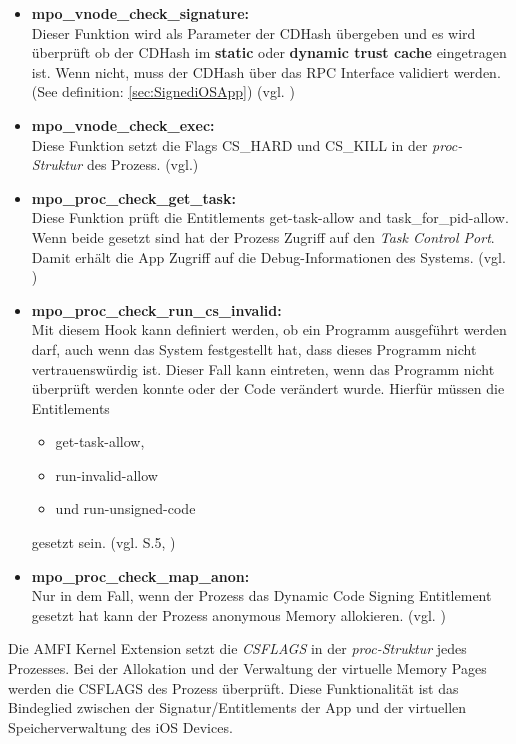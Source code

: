 \begin{itemize}
    \item \label{item:AMFIfunc} \textbf{mpo\_vnode\_check\_signature:} \\
    Dieser Funktion wird als Parameter der CDHash übergeben und es wird überprüft ob der CDHash im \textbf{static} oder \textbf{dynamic trust cache} eingetragen ist. Wenn nicht, muss der CDHash über das RPC Interface validiert werden. (See definition: \ref{sec:SignediOSApp}) (vgl. \cite{iOSSec[5], Hacking[1]})
    \item \textbf{mpo\_vnode\_check\_exec:}\\
    Diese Funktion setzt die Flags CS\_HARD und CS\_KILL in der \textit{\glqq proc-Struktur\grqq{}} des Prozess. (vgl.\cite{iOSSec[5],  Hacking[1]})
    \item \textbf{mpo\_proc\_check\_get\_task:}\\
    Diese Funktion prüft die Entitlements get-task-allow and task\_for\_pid-allow. Wenn beide gesetzt sind hat der Prozess Zugriff auf den \textit{\glqq Task Control Port\grqq{}}. Damit erhält  die App Zugriff auf die Debug-Informationen des Systems. (vgl. \cite{iOSSec[5],  Hacking[1]})
    
    \item \textbf{mpo\_proc\_check\_run\_cs\_invalid:} \\
    Mit diesem Hook kann definiert werden, ob ein Programm ausgeführt werden darf, auch wenn das System festgestellt hat, dass dieses Programm nicht vertrauenswürdig ist. Dieser Fall kann eintreten, wenn das Programm nicht überprüft werden konnte oder der Code verändert wurde. Hierfür müssen die Entitlements 
    \begin{itemize}
        \item get-task-allow, 
        \item run-invalid-allow 
        \item und run-unsigned-code 
     \end{itemize} 
     gesetzt sein. (vgl. \cite{iOSSec[5]} S.5, \cite{Hacking[1]})
    
    \item \textbf{mpo\_proc\_check\_map\_anon:}\\
    Nur in dem Fall, wenn der Prozess das Dynamic Code Signing Entitlement gesetzt hat kann der Prozess anonymous Memory allokieren. (vgl. \cite{iOSSec[5],  Hacking[1]})
\end{itemize}

Die AMFI Kernel Extension setzt die \textit{\glqq CSFLAGS\grqq{}} in der \textit{\glqq proc-Struktur\grqq{}} jedes Prozesses. Bei der Allokation und der Verwaltung der virtuelle Memory Pages werden die CSFLAGS des Prozess überprüft. Diese Funktionalität ist das Bindeglied zwischen der Signatur/Entitlements der App und der virtuellen Speicherverwaltung des iOS Devices. 

